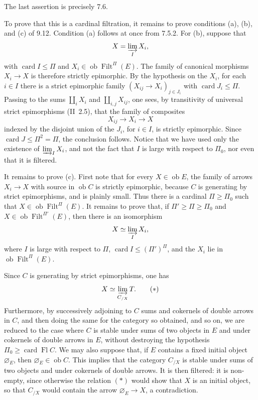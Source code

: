 \documentclass[11pt]{article}
\newcommand{\ob}{\operatorname{ob}}
\newcommand{\Filt}{\operatorname{Filt}}
\newcommand{\card}{\operatorname{card}}
\newcommand{\Fl}{\operatorname{Fl}}
\newcommand{\emptyE}{\varnothing_E}
\begin{document}
The last assertion is precisely 7.6.

To prove that this is a cardinal filtration, it remains to prove conditions (a), (b), and (c) of 9.12. Condition (a) follows at once from 7.5.2. For (b), suppose that
\[
 X=\varinjlim_I X_i,
\]
with $\card I\leq\Pi$ and $X_i\in\ob\Filt^\Pi(E)$. The family of canonical morphisms $X_i\to X$ is therefore strictly epimorphic. By the hypothesis on the $X_i$, for each $i\in I$ there is a strict epimorphic family $(X_{ij}\to X_i)_{j\in J_i}$ with $\card J_i\leq\Pi$. Passing to the sums $\coprod_i X_i$ and $\coprod_{i,j}X_{ij}$, one sees, by transitivity of universal strict epimorphisms (II~2.5), that the family of composites
\[
 X_{ij}\longrightarrow X_i\longrightarrow X
\]
indexed by the disjoint union of the $J_i$, for $i\in I$, is strictly epimorphic. Since $\card J\leq\Pi^2=\Pi$, the conclusion follows. Notice that we have used only the existence of $\varinjlim_I X_i$, and not the fact that $I$ is large with respect to $\Pi_0$, nor even that it is filtered.

It remains to prove (c). First note that for every $X\in\ob E$, the family of arrows $X_i\to X$ with source in $\ob C$ is strictly epimorphic, because $C$ is generating by strict epimorphisms, and is plainly small. Thus there is a cardinal $\Pi\geq\Pi_0$ such that $X\in\ob\Filt^\Pi(E)$. It remains to prove that, if $\Pi'\geq\Pi\geq\Pi_0$ and $X\in\ob\Filt^{\Pi'}(E)$, then there is an isomorphism
\[
 X\simeq \varinjlim_I X_i,
\]
where $I$ is large with respect to $\Pi$, $\card I\leq(\Pi')^\Pi$, and the $X_i$ lie in $\ob\Filt^\Pi(E)$.

Since $C$ is generating by strict epimorphisms, one has
\begin{equation*}
 X\simeq \varinjlim_{C_{/X}} T .\tag{$\ast$}
\end{equation*}
Furthermore, by successively adjoining to $C$ sums and cokernels of double arrows in $C$, and then doing the same for the category so obtained, and so on, we are reduced to the case where $C$ is stable under sums of two objects in $E$ and under cokernels of double arrows in $E$, without destroying the hypothesis $\Pi_0\geq\card\Fl C$. We may also suppose that, if $E$ contains a fixed initial object $\emptyE$, then $\emptyE\in\ob C$. This implies that the category $C_{/X}$ is stable under sums of two objects and under cokernels of double arrows. It is then filtered: it is non-empty, since otherwise the relation $(\ast)$ would show that $X$ is an initial object, so that $C_{/X}$ would contain the arrow $\emptyE\to X$, a contradiction.
\end{document}

